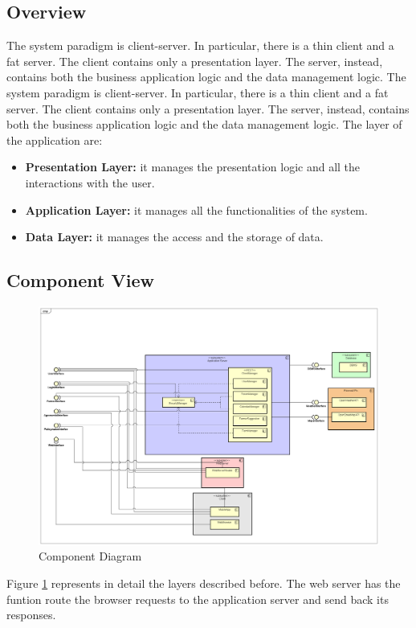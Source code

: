 \subsection{Overview}
The system paradigm is client-server. In particular, there is a thin client and a fat server. 
The client contains only a presentation layer. 
The server, instead, contains both the business application logic and the data management logic. 
The system paradigm is client-server. In particular, there is a thin client and a fat server. The client contains only a presentation layer. The server, instead, contains both the business application logic and the data management logic. 
The layer of the application are:
\begin{itemize}
    \item \textbf{Presentation Layer:} it manages the presentation logic and all the interactions with the user.
    \item \textbf{Application Layer:} it manages all the functionalities of the system.
    \item \textbf{Data Layer:} it manages the access and the storage of data.
\end{itemize}
\subsection{Component View}
\begin{figure}[H]
    \includegraphics[width=\textwidth,height=\textheight,keepaspectratio]{Images/ComponentDiagram.png}
    \caption{Component Diagram}
    \label{fig:component_diagram}
\end{figure}

Figure \ref{fig:component_diagram}  represents in detail the layers described before. The web server has the funtion
route the browser requests to the application server and send back its responses.

